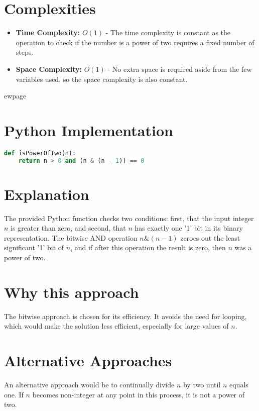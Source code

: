 \section*{Complexities}

\begin{itemize}
    \item \textbf{Time Complexity:} \(O(1)\) - The time complexity is constant as the operation to check if the number is a power of two requires a fixed number of steps.
    \item \textbf{Space Complexity:} \(O(1)\) - No extra space is required aside from the few variables used, so the space complexity is also constant.
\end{itemize}


ewpage
\section*{Python Implementation}

\begin{fullwidth}
\begin{lstlisting}[language=Python]
def isPowerOfTwo(n):
    return n > 0 and (n & (n - 1)) == 0
\end{lstlisting}

\end{fullwidth}

\section*{Explanation}
The provided Python function checks two conditions: first, that the input integer \(n\) is greater than zero, and second, that \(n\) has exactly one '1' bit in its binary representation. The bitwise AND operation \(n \& (n - 1)\) zeroes out the least significant '1' bit of \(n\), and if after this operation the result is zero, then \(n\) was a power of two.

\section*{Why this approach}
The bitwise approach is chosen for its efficiency. It avoids the need for looping, which would make the solution less efficient, especially for large values of \(n\).

\section*{Alternative Approaches}
An alternative approach would be to continually divide \(n\) by two until \(n\) equals one. If \(n\) becomes non-integer at any point in this process, it is not a power of two.


